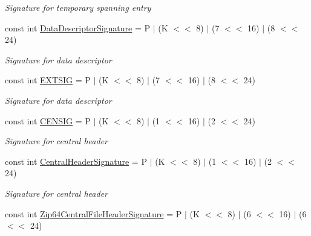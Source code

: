 \begin{DoxyCompactItemize}
\begin{DoxyCompactList}\small\item\em Signature for temporary spanning entry \end{DoxyCompactList}\item 
const int \hyperlink{class_i_c_sharp_code_1_1_sharp_zip_lib_1_1_zip_1_1_zip_constants_a56eac82d575fc307c3180f2ae61a9a5b}{Data\+Descriptor\+Signature} = \textquotesingle{}P\textquotesingle{} $\vert$ (\textquotesingle{}K\textquotesingle{} $<$$<$ 8) $\vert$ (7 $<$$<$ 16) $\vert$ (8 $<$$<$ 24)
\begin{DoxyCompactList}\small\item\em Signature for data descriptor \end{DoxyCompactList}\item 
const int \hyperlink{class_i_c_sharp_code_1_1_sharp_zip_lib_1_1_zip_1_1_zip_constants_a5d8fad8290812fb0ed4f1631e05a2fbc}{E\+X\+T\+S\+IG} = \textquotesingle{}P\textquotesingle{} $\vert$ (\textquotesingle{}K\textquotesingle{} $<$$<$ 8) $\vert$ (7 $<$$<$ 16) $\vert$ (8 $<$$<$ 24)
\begin{DoxyCompactList}\small\item\em Signature for data descriptor \end{DoxyCompactList}\item 
const int \hyperlink{class_i_c_sharp_code_1_1_sharp_zip_lib_1_1_zip_1_1_zip_constants_a1f7dcdf417ccec2f9126e3ce9483bb90}{C\+E\+N\+S\+IG} = \textquotesingle{}P\textquotesingle{} $\vert$ (\textquotesingle{}K\textquotesingle{} $<$$<$ 8) $\vert$ (1 $<$$<$ 16) $\vert$ (2 $<$$<$ 24)
\begin{DoxyCompactList}\small\item\em Signature for central header \end{DoxyCompactList}\item 
const int \hyperlink{class_i_c_sharp_code_1_1_sharp_zip_lib_1_1_zip_1_1_zip_constants_a524827a3ba5d1f5130e73241da0c23ec}{Central\+Header\+Signature} = \textquotesingle{}P\textquotesingle{} $\vert$ (\textquotesingle{}K\textquotesingle{} $<$$<$ 8) $\vert$ (1 $<$$<$ 16) $\vert$ (2 $<$$<$ 24)
\begin{DoxyCompactList}\small\item\em Signature for central header \end{DoxyCompactList}\item 
const int \hyperlink{class_i_c_sharp_code_1_1_sharp_zip_lib_1_1_zip_1_1_zip_constants_a69d263fc12463ddcb14bc42fbb6cea25}{Zip64\+Central\+File\+Header\+Signature} = \textquotesingle{}P\textquotesingle{} $\vert$ (\textquotesingle{}K\textquotesingle{} $<$$<$ 8) $\vert$ (6 $<$$<$ 16) $\vert$ (6 $<$$<$ 24)
$$
\end{DoxyCompactItemize}
